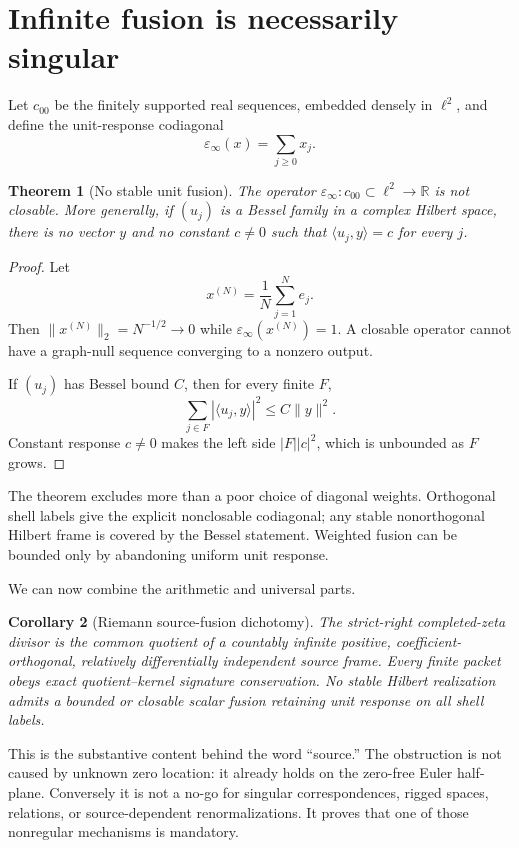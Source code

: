 \documentclass[11pt]{article}
\newtheorem{theorem}{Theorem}[section]
\newtheorem{corollary}[theorem]{Corollary}
\theoremstyle{definition}
\theoremstyle{remark}
\newcommand{\R}{\mathbb R}
\newcommand{\eps}{\varepsilon}
\begin{document}
\section{Infinite fusion is necessarily singular}

Let $c_{00}$ be the finitely supported real sequences, embedded densely in $\ell^2$, and define
the unit-response codiagonal
\[
 \eps_\infty(x)=\sum_{j\geq0}x_j.
 \tag{5.1}
\]

\begin{theorem}[No stable unit fusion]\label{thm:singular}
The operator $\eps_\infty:c_{00}\subset\ell^2\to\R$ is not closable.  More generally, if
$(u_j)$ is a Bessel family in a complex Hilbert space, there is no vector $y$ and no constant
$c\ne0$ such that $\langle u_j,y\rangle=c$ for every $j$.
\end{theorem}

\begin{proof}
Let
\[
 x^{(N)}=\frac1N\sum_{j=1}^Ne_j.
\]
Then $\|x^{(N)}\|_2=N^{-1/2}\to0$ while $\eps_\infty(x^{(N)})=1$.  A closable operator cannot
have a graph-null sequence converging to a nonzero output.

If $(u_j)$ has Bessel bound $C$, then for every finite $F$,
\[
 \sum_{j\in F}|\langle u_j,y\rangle|^2\leq C\|y\|^2.
\]
Constant response $c\ne0$ makes the left side $|F||c|^2$, which is unbounded as $F$ grows.
\end{proof}

The theorem excludes more than a poor choice of diagonal weights.  Orthogonal shell labels give
the explicit nonclosable codiagonal; any stable nonorthogonal Hilbert frame is covered by the
Bessel statement.  Weighted fusion can be bounded only by abandoning uniform unit response.

We can now combine the arithmetic and universal parts.

\begin{corollary}[Riemann source-fusion dichotomy]\label{cor:riemann-fusion}
The strict-right completed-zeta divisor is the common quotient of a countably infinite positive,
coefficient-orthogonal, relatively differentially independent source frame.  Every finite packet
obeys exact quotient--kernel signature conservation.  No stable Hilbert realization admits a
bounded or closable scalar fusion retaining unit response on all shell labels.
\end{corollary}

This is the substantive content behind the word ``source.''  The obstruction is not caused by
unknown zero location: it already holds on the zero-free Euler half-plane.  Conversely it is not
a no-go for singular correspondences, rigged spaces, relations, or source-dependent
renormalizations.  It proves that one of those nonregular mechanisms is mandatory.
\end{document}
